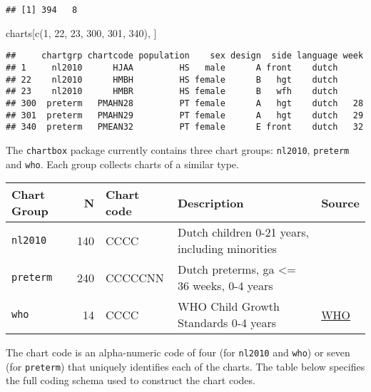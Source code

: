 \documentclass[
]{book}
\newenvironment{Shaded}{\begin{snugshade}}{\end{snugshade}}
\newcommand{\DecValTok}[1]{\textcolor[rgb]{0.00,0.00,0.81}{#1}}
\newcommand{\FunctionTok}[1]{\textcolor[rgb]{0.00,0.00,0.00}{#1}}
\newcommand{\NormalTok}[1]{#1}
\begin{document}
\begin{verbatim}
## [1] 394   8
\end{verbatim}

\begin{Shaded}
\begin{Highlighting}[]
\NormalTok{charts[}\FunctionTok{c}\NormalTok{(}\DecValTok{1}\NormalTok{, }\DecValTok{22}\NormalTok{, }\DecValTok{23}\NormalTok{, }\DecValTok{300}\NormalTok{, }\DecValTok{301}\NormalTok{, }\DecValTok{340}\NormalTok{), ]}
\end{Highlighting}
\end{Shaded}

\begin{verbatim}
##     chartgrp chartcode population    sex design  side language week
## 1     nl2010      HJAA         HS   male      A front    dutch     
## 22    nl2010      HMBH         HS female      B   hgt    dutch     
## 23    nl2010      HMBR         HS female      B   wfh    dutch     
## 300  preterm   PMAHN28         PT female      A   hgt    dutch   28
## 301  preterm   PMAHN29         PT female      A   hgt    dutch   29
## 340  preterm   PMEAN32         PT female      E front    dutch   32
\end{verbatim}

The \texttt{chartbox} package currently contains three chart groups: \texttt{nl2010}, \texttt{preterm} and \texttt{who}. Each group collects charts of a similar type.

\begin{longtable}[]{@{}lrlll@{}}
\toprule
Chart Group & N & Chart code & Description & Source \\
\midrule
\endhead
\texttt{nl2010} & 140 & CCCC & Dutch children 0-21 years, including minorities & \citet{talma2010} \\
\texttt{preterm} & 240 & CCCCCNN & Dutch preterms, ga \textless= 36 weeks, 0-4 years & \citet{bocca2012} \\
\texttt{who} & 14 & CCCC & WHO Child Growth Standards 0-4 years & \href{https://www.who.int/childgrowth/en/}{WHO} \\
\bottomrule
\end{longtable}

The chart code is an alpha-numeric code of four (for \texttt{nl2010} and \texttt{who}) or seven (for \texttt{preterm}) that uniquely identifies each of the charts. The table below specifies the full coding schema used to construct the chart codes.
\end{document}

